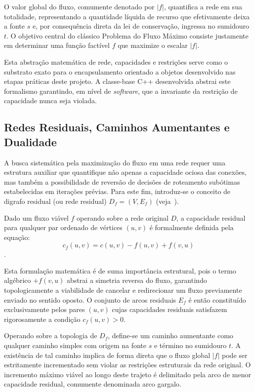 \documentclass[12pt,a4paper]{article}
\begin{document}
O valor global do fluxo, comumente denotado por $|f|$, quantifica a rede em sua totalidade, representando a quantidade líquida de recurso que efetivamente deixa a fonte $s$ e, por consequência direta da lei de conservação, ingressa no sumidouro $t$. O objetivo central do clássico Problema do Fluxo Máximo consiste justamente em determinar uma função factível $f$ que maximize o escalar $|f|$.

Esta abstração matemática de rede, capacidades e restrições serve como o substrato exato para o encapsulamento orientado a objetos desenvolvido nas etapas práticas deste projeto. A classe-base C++ desenvolvida abstrai este formalismo garantindo, em nível de \textit{software}, que a invariante da restrição de capacidade nunca seja violada.

\subsection{Redes Residuais, Caminhos Aumentantes e Dualidade}

A busca sistemática pela maximização do fluxo em uma rede requer uma estrutura auxiliar que quantifique não apenas a capacidade ociosa das conexões, mas também a possibilidade de reversão de decisões de roteamento subótimas estabelecidas em iterações prévias. Para este fim, introduz-se o conceito de digrafo residual (ou rede residual) $D_f = (V, E_f)$ (veja~\cite{ahuja1993network, ford1956maximal}).

Dado um fluxo viável $f$ operando sobre a rede original $D$, a capacidade residual para qualquer par ordenado de vértices $(u,v)$ é formalmente definida pela equação:
$$c_f(u,v) = c(u,v) - f(u,v) + f(v,u)$$.

Esta formulação matemática é de suma importância estrutural, pois o termo algébrico $+ f(v,u)$ abstrai a simetria reversa do fluxo, garantindo topologicamente a viabilidade de cancelar e redirecionar um fluxo previamente enviado no sentido oposto. O conjunto de arcos residuais $E_f$ é então constituído exclusivamente pelos pares $(u,v)$ cujas capacidades residuais satisfazem rigorosamente a condição $c_f(u,v) > 0$.

Operando sobre a topologia de $D_f$, define-se um caminho aumentante como qualquer caminho simples com origem na fonte $s$ e término no sumidouro $t$. A existência de tal caminho implica de forma direta que o fluxo global $|f|$ pode ser estritamente incrementado sem violar as restrições estruturais da rede original. O incremento máximo viável ao longo deste trajeto é delimitado pela arco de menor capacidade residual, comumente denominada arco gargalo.
\end{document}
